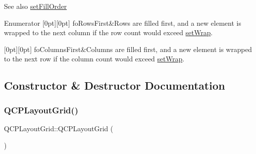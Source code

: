 \begin{DoxySeeAlso}{See also}
\hyperlink{classQCPLayoutGrid_affc2f3cfd22f28698c5b29b960d2a391}{set\+Fill\+Order} 
\end{DoxySeeAlso}
\begin{DoxyEnumFields}{Enumerator}
[0pt][0pt]{}\mbox{\label{classQCPLayoutGrid_a7d49ee08773de6b2fd246edfed353ccaa0202730954e26c474cc820164aedce3e}} 
fo\+Rows\+First&Rows are filled first, and a new element is wrapped to the next column if the row count would exceed \hyperlink{classQCPLayoutGrid_ab36af18d77e4428386d02970382ee598}{set\+Wrap}. \\
\hline

[0pt][0pt]{}\mbox{\label{classQCPLayoutGrid_a7d49ee08773de6b2fd246edfed353ccaac4cb4b796ec4822d5894b47b51627fb3}} 
fo\+Columns\+First&Columns are filled first, and a new element is wrapped to the next row if the column count would exceed \hyperlink{classQCPLayoutGrid_ab36af18d77e4428386d02970382ee598}{set\+Wrap}. \\
\hline

\end{DoxyEnumFields}


\subsection{Constructor \& Destructor Documentation}
\mbox{\label{classQCPLayoutGrid_ab2a4c1587dc8aed4c41c509c8d8d2a64}} 
\subsubsection{\texorpdfstring{Q\+C\+P\+Layout\+Grid()}{QCPLayoutGrid()}}
{\footnotesize\ttfamily Q\+C\+P\+Layout\+Grid\+::\+Q\+C\+P\+Layout\+Grid (\begin{DoxyParamCaption}{ }\end{DoxyParamCaption})\hspace{0.3cm}{\ttfamily [explicit]}}

